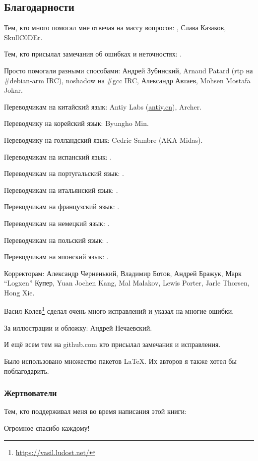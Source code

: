 \subsection*{Благодарности}

Тем, кто много помогал мне отвечая на массу вопросов: \HERMIT, Слава  Казаков, SkullC0DEr.

Тем, кто присылал замечания об ошибках и неточностях: \PeopleMistakesInaccuracies{}.

Просто помогали разными способами:
Андрей Зубинский,
Arnaud Patard (rtp на \#debian-arm IRC),
noshadow на \#gcc IRC,
Александр Автаев,
Mohsen Mostafa Jokar.

Переводчикам на китайский язык:
Antiy Labs (\href{http://antiy.cn}{antiy.cn}), Archer.

Переводчику на корейский язык: Byungho Min.

Переводчику на голландский язык: Cedric Sambre (AKA Midas).

Переводчикам на испанский язык: \PeopleSpanishTranslators{}.

Переводчикам на португальский язык: \PeoplePTBRTranslators{}.

Переводчикам на итальянский язык: \PeopleItalianTranslators{}.

Переводчикам на французский язык: \PeopleFrenchTranslators{}.

Переводчикам на немецкий язык: \PeopleGermanTranslators{}.

Переводчикам на польский язык: \PeoplePolishTranslators{}.

Переводчикам на японский язык: \PeopleJapaneseTranslators{}.

Корректорам:
Александр  Черненький,
Владимир Ботов,
Андрей Бражук,
Марк ``Logxen'' Купер, Yuan Jochen Kang, Mal Malakov, Lewis Porter, Jarle Thorsen, Hong Xie.

Васил Колев\footnote{\url{https://vasil.ludost.net/}} сделал очень много исправлений и указал на многие ошибки.

За иллюстрации и обложку: Андрей Нечаевский.

И ещё всем тем на github.com кто присылал замечания и исправления\FNGithubContributors{}.

Было использовано множество пакетов \LaTeX. Их авторов я также хотел бы поблагодарить.

\subsubsection*{Жертвователи}

Тем, кто поддерживал меня во время написания этой книги:



Огромное спасибо каждому!

